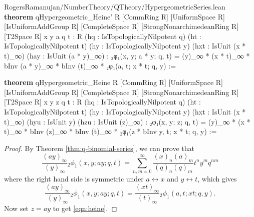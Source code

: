 \documentclass[12pt]{amsart}
\theoremstyle{definition}
\theoremstyle{remark}
\numberwithin{equation}{subsection}
\newcommand{\kw}[1]{\textcolor{keywordcolor}{\textbf{#1}}}
\newcommand{\var}[1]{\textcolor{tacticcolor}{#1}}
\newcommand{\imp}[1]{\textcolor{commentcolor}{\textbraceleft#1\textbraceright}}
\begin{document}
\begin{code}{RogersRamanujan/NumberTheory/QTheory/HypergeometricSeries.lean}
\kw{theorem} qHypergeometric_Heine' \imp{R} [CommRing \var{R}] [UniformSpace \var{R}]
  [IsUniformAddGroup \var{R}] [CompleteSpace \var{R}] [StrongNonarchimedeanRing \var{R}] [T2Space \var{R}]
  \imp{x y a q t : R} (\var{hq} : IsTopologicallyNilpotent \var{q}) (\var{ht} : IsTopologicallyNilpotent \var{t})
  (\var{hy} : IsTopologicallyNilpotent \var{y})
  (\var{hxt} : IsUnit (\var{x} * \var{t})_∞) (\var{hay} : IsUnit (\var{a} * \var{y})_∞) :
  ₂φ₁(\var{x}, \var{y}; \var{a} * \var{y}; \var{q}, \var{t}) =
    (\var{y})_∞ * (\var{x} * \var{t})_∞ * bInv (\var{a} * \var{y})_∞ * bInv (\var{t})_∞ * ₂φ₁(\var{a}, \var{t}; \var{x} * \var{t}; \var{q}, \var{y}) :=

\kw{theorem} qHypergeometric_Heine \imp{R} [CommRing \var{R}] [UniformSpace \var{R}]
  [IsUniformAddGroup \var{R}] [CompleteSpace \var{R}] [StrongNonarchimedeanRing \var{R}] [T2Space \var{R}]
  \imp{x y z q t : R} (\var{hq} : IsTopologicallyNilpotent \var{q}) (\var{ht} : IsTopologicallyNilpotent \var{t})
  (\var{hy} : IsTopologicallyNilpotent \var{y})
  (\var{hxt} : IsUnit (\var{x} * \var{t})_∞) (\var{hyu} : IsUnit \var{y}) (\var{hzu} : IsUnit (\var{z})_∞) :
  ₂φ₁(\var{x}, \var{y}; \var{z}; \var{q}, \var{t}) =
    (\var{y})_∞ * (\var{x} * \var{t})_∞ * bInv (\var{z})_∞ * bInv (\var{t})_∞ * ₂φ₁(\var{z} * bInv \var{y}, \var{t}; \var{x} * \var{t}; \var{q}, \var{y}) :=
\end{code}
\begin{proof}
    By Theorem \ref{thm:q-binomial-series}, we can prove that
    \begin{equation}
        \frac{(ay)_\infty}{(y)_\infty} {}_{2}\phi_{1}(x,y;ay;q,t) = \sum_{n, m = 0}^{\infty} \frac{(x)_n(a)_m}{(q)_n(q)_m} t^n y^m q^{nm}
    \end{equation}
    where the right hand side is symmetric under $a \leftrightarrow x$ and $y \leftrightarrow t$, which gives
    \begin{equation}
        \frac{(ay)_\infty}{(y)_\infty} {}_{2}\phi_{1}(x,y;ay;q,t) = \frac{(xt)_\infty}{(t)_\infty} {}_{2}\phi_{1}(a, t;xt;q,y).
    \end{equation}
    Now set $z = ay$ to get \eqref{eqn:heine}.
\end{proof}
\end{document}
